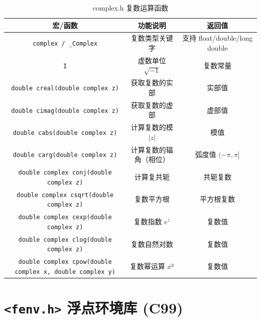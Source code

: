 \begin{table}[H]
\centering
\small
\renewcommand{\arraystretch}{1.5}
\begin{tabulary}{\linewidth}{CCC}
\toprule
\textbf{宏/函数} & \textbf{功能说明} & \textbf{返回值} \\ \midrule
\texttt{complex / \_Complex} & 复数类型关键字 & 支持 float/double/long double \\ 
\texttt{I} & 虚数单位 $\sqrt{-1}$ & 复数常量 \\ 
\texttt{double creal(double complex z)} & 获取复数的实部 & 实部值 \\ 
\texttt{double cimag(double complex z)} & 获取复数的虚部 & 虚部值 \\ 
\texttt{double cabs(double complex z)} & 计算复数的模 $|z|$ & 模值 \\ 
\texttt{double carg(double complex z)} & 计算复数的辐角（相位） & 弧度值 $(-\pi, \pi]$ \\ 
\texttt{double complex conj(double complex z)} & 计算复共轭 & 共轭复数 \\ 
\texttt{double complex csqrt(double complex z)} & 复数平方根 & 平方根复数 \\ 
\texttt{double complex cexp(double complex z)} & 复数指数 $e^z$ & 复数值 \\ 
\texttt{double complex clog(double complex z)} & 复数自然对数 & 复数值 \\ 
\texttt{double complex cpow(double complex x, double complex y)} & 复数幂运算 $x^y$ & 复数值 \\ \bottomrule
\end{tabulary}
\caption{complex.h 复数运算函数}
\label{tab:complex}
\end{table}

\section{\texorpdfstring{\texttt{<fenv.h>} 浮点环境库 (C99)}{<fenv.h> 浮点环境库 (C99)}}

